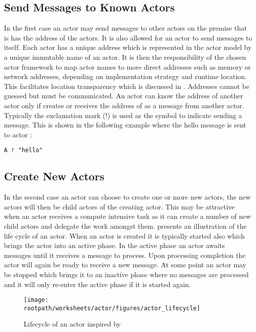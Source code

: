 \subsection{Send Messages to Known Actors}
In the first case an actor may send messages to other actors on the premise that is has the address of the actors. It is also allowed for an actor to send messages to itself. Each actor has a unique address which is represented in the actor model by a unique immutable name of an actor\cite[p. 2]{karmani2009actor}. It is then the responsibility of the chosen actor framework to map actor names to more direct addresses such as memory or network addresses, depending on implementation strategy and runtime location\cite[p. 3]{hewitt2014actor}. This facilitates location transparency which is discussed in . Addresses cannot be guessed but must be communicated. An actor  can know the address of another actor  only if  creates  or receives the address of  as a message from another actor. Typically the exclamation mark (!) is used as the symbol to indicate sending a message. This is shown in the following example where the hello message is sent to actor :
\begin{verbatim}
A ! "hello"
\end{verbatim}

\subsection{Create New Actors}
In the second case an actor can choose to create one or more new actors, the new actors will then be child actors of the creating actor. This may be attractive when an actor receives a compute intensive task as it can create a number of new child actors and delegate the work amongst them.  presents an illustration of the life cycle of an actor. When an actor is created it is typically started also which brings the actor into an active phase. In the active phase an actor awaits messages until it receives a message to process. Upon processing completion the actor will again be ready to receive a new message. At some point an actor may be stopped which brings it to an inactive phase where no messages are processed and it will only re-enter the active phase if it is started again.

\begin{figure}[ht!]
\centering
\texttt{[image: \\rootpath/worksheets/actor/figures/actor\_lifecycle]}
\caption{Lifecycle of an actor inspired by \cite[Figure 12]{subramaniam2011programming}}\label{fig:actor_lifecycle}
\end{figure}

